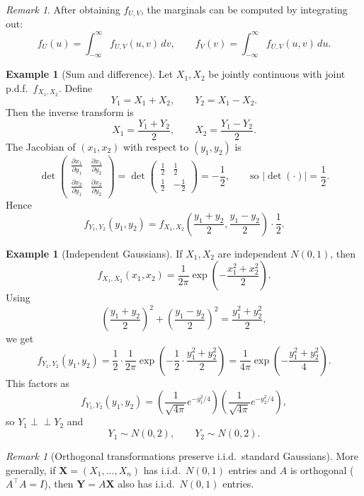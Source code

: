 \documentclass[11pt]{article}
\theoremstyle{plain}
\theoremstyle{definition}
\newtheorem{example}[theorem]{Example}
\theoremstyle{remark}
\newtheorem{remark}[theorem]{Remark}
\begin{document}
	\begin{remark}
		After obtaining \(f_{U,V}\), the marginals can be computed by integrating out:
		\[
		f_U(u)=\int_{-\infty}^{\infty} f_{U,V}(u,v)\,dv,
		\qquad
		f_V(v)=\int_{-\infty}^{\infty} f_{U,V}(u,v)\,du.
		\]
	\end{remark}
	
	
	
	\begin{example}[Sum and difference]
		Let \(X_1,X_2\) be jointly continuous with joint p.d.f.\ \(f_{X_1,X_2}\).
		Define
		\[
		Y_1=X_1+X_2,\qquad Y_2=X_1-X_2.
		\]
		Then the inverse transform is
		\[
		X_1=\frac{Y_1+Y_2}{2},\qquad X_2=\frac{Y_1-Y_2}{2}.
		\]
		The Jacobian of \((x_1,x_2)\) with respect to \((y_1,y_2)\) is
		\[
		\det
		\begin{pmatrix}
			\frac{\partial x_1}{\partial y_1} & \frac{\partial x_1}{\partial y_2}\\[6pt]
			\frac{\partial x_2}{\partial y_1} & \frac{\partial x_2}{\partial y_2}
		\end{pmatrix}
		=
		\det
		\begin{pmatrix}
			\frac12 & \frac12\\[4pt]
			\frac12 & -\frac12
		\end{pmatrix}
		=-\frac12,
		\qquad \text{so } \left|\det(\cdot)\right|=\frac12.
		\]
		Hence
		\[
		f_{Y_1,Y_2}(y_1,y_2)
		=
		f_{X_1,X_2}\!\left(\frac{y_1+y_2}{2},\frac{y_1-y_2}{2}\right)\cdot \frac12.
		\]
	\end{example}
	
	\begin{example}[Independent Gaussians]
		If \(X_1,X_2\) are independent \(N(0,1)\), then
		\[
		f_{X_1,X_2}(x_1,x_2)=\frac{1}{2\pi}\exp\!\left(-\frac{x_1^2+x_2^2}{2}\right).
		\]
		Using
		\[
		\left(\frac{y_1+y_2}{2}\right)^2+\left(\frac{y_1-y_2}{2}\right)^2=\frac{y_1^2+y_2^2}{2},
		\]
		we get
		\[
		f_{Y_1,Y_2}(y_1,y_2)
		=\frac12\cdot \frac{1}{2\pi}\exp\!\left(-\frac{1}{2}\cdot \frac{y_1^2+y_2^2}{2}\right)
		=\frac{1}{4\pi}\exp\!\left(-\frac{y_1^2+y_2^2}{4}\right).
		\]
		This factors as
		\[
		f_{Y_1,Y_2}(y_1,y_2)=
		\left(\frac{1}{\sqrt{4\pi}}e^{-y_1^2/4}\right)
		\left(\frac{1}{\sqrt{4\pi}}e^{-y_2^2/4}\right),
		\]
		so \(Y_1\perp\!\!\!\perp Y_2\) and
		\[
		Y_1\sim N(0,2),\qquad Y_2\sim N(0,2).
		\]
	\end{example}
	
	\begin{remark}[Orthogonal transformations preserve i.i.d.\ standard Gaussians]
		More generally, if \(\bm{X}=(X_1,\dots,X_n)\) has i.i.d.\ \(N(0,1)\) entries and \(A\) is orthogonal
		(\(A^\top A=I\)), then \(\bm{Y}=A\bm{X}\) also has i.i.d.\ \(N(0,1)\) entries.
	\end{remark}
	
\end{document}
